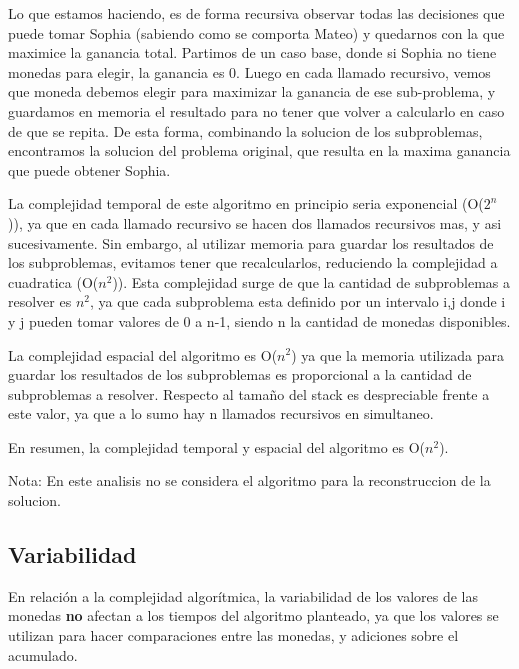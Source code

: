 Lo que estamos haciendo, es de forma recursiva observar todas las decisiones que puede tomar Sophia (sabiendo como se comporta Mateo) y quedarnos con la que maximice la ganancia total. 
Partimos de un caso base, donde si Sophia no tiene monedas para elegir, la ganancia es 0.
Luego en cada llamado recursivo, vemos que moneda debemos elegir para maximizar la ganancia de ese sub-problema, y guardamos en memoria el resultado para no tener que volver a calcularlo en caso de que se repita. De esta forma, combinando la solucion de los subproblemas, encontramos la solucion del problema original, que resulta en la maxima ganancia que puede obtener Sophia.


La complejidad temporal de este algoritmo en principio seria exponencial (O($2^n$)), ya que en cada llamado recursivo se hacen dos llamados recursivos mas, y asi sucesivamente.
Sin embargo, al utilizar memoria para guardar los resultados de los subproblemas, evitamos tener que recalcularlos, reduciendo la complejidad a cuadratica (O($n^2$)). Esta complejidad surge de que la cantidad de subproblemas a resolver es $n^2$, ya que cada subproblema esta definido por un intervalo i,j donde i y j pueden tomar valores de 0 a n-1, siendo n la cantidad de monedas disponibles.

La complejidad espacial del algoritmo es O($n^2$) ya que la memoria utilizada para guardar los resultados de los subproblemas es proporcional a la cantidad de subproblemas a resolver. Respecto al tamaño del stack es despreciable frente a este valor, ya que a lo sumo hay n llamados recursivos en simultaneo.

En resumen, la complejidad temporal y espacial del algoritmo es O($n^2$).

Nota: En este analisis no se considera el algoritmo para la reconstruccion de la solucion. 

\subsection{Variabilidad}

En relación a la complejidad algorítmica, la variabilidad de los valores de las monedas \textbf{no} afectan a los tiempos del algoritmo planteado, ya que los valores se utilizan para hacer comparaciones entre las monedas, y adiciones sobre el acumulado.

